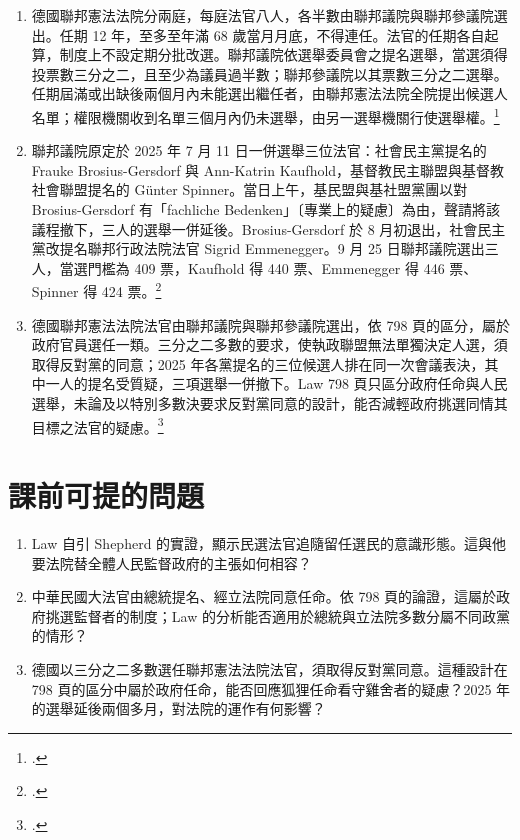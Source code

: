 \begin{enumerate}
\tightlist
\item
  德國聯邦憲法法院分兩庭，每庭法官八人，各半數由聯邦議院與聯邦參議院選出。任期 12 年，至多至年滿 68 歲當月月底，不得連任。法官的任期各自起算，制度上不設定期分批改選。聯邦議院依選舉委員會之提名選舉，當選須得投票數三分之二，且至少為議員過半數；聯邦參議院以其票數三分之二選舉。任期屆滿或出缺後兩個月內未能選出繼任者，由聯邦憲法法院全院提出候選人名單；權限機關收到名單三個月內仍未選舉，由另一選舉機關行使選舉權。\footcite{gg,bverfgg}
\item
  聯邦議院原定於 2025 年 7 月 11 日一併選舉三位法官：社會民主黨提名的 Frauke Brosius-Gersdorf 與 Ann-Katrin Kaufhold，基督教民主聯盟與基督教社會聯盟提名的 Günter Spinner。當日上午，基民盟與基社盟黨團以對 Brosius-Gersdorf 有「fachliche Bedenken」〔專業上的疑慮〕為由，聲請將該議程撤下，三人的選舉一併延後。Brosius-Gersdorf 於 8 月初退出，社會民主黨改提名聯邦行政法院法官 Sigrid Emmenegger。9 月 25 日聯邦議院選出三人，當選門檻為 409 票，Kaufhold 得 440 票、Emmenegger 得 446 票、Spinner 得 424 票。\footcite{rechtslupe2025,zdf2025}
\item
  德國聯邦憲法法院法官由聯邦議院與聯邦參議院選出，依 798 頁的區分，屬於政府官員選任一類。三分之二多數的要求，使執政聯盟無法單獨決定人選，須取得反對黨的同意；2025 年各黨提名的三位候選人排在同一次會議表決，其中一人的提名受質疑，三項選舉一併撤下。Law 798 頁只區分政府任命與人民選舉，未論及以特別多數決要求反對黨同意的設計，能否減輕政府挑選同情其目標之法官的疑慮。\footcite[798]{law2009}
\end{enumerate}

\section{課前可提的問題}
\label{sec:40_selection-5}

\begin{enumerate}
\tightlist
\item Law 自引 Shepherd 的實證，顯示民選法官追隨留任選民的意識形態。這與他要法院替全體人民監督政府的主張如何相容？
\item 中華民國大法官由總統提名、經立法院同意任命。依 798 頁的論證，這屬於政府挑選監督者的制度；Law 的分析能否適用於總統與立法院多數分屬不同政黨的情形？
\item 德國以三分之二多數選任聯邦憲法法院法官，須取得反對黨同意。這種設計在 798 頁的區分中屬於政府任命，能否回應狐狸任命看守雞舍者的疑慮？2025 年的選舉延後兩個多月，對法院的運作有何影響？
\end{enumerate}
